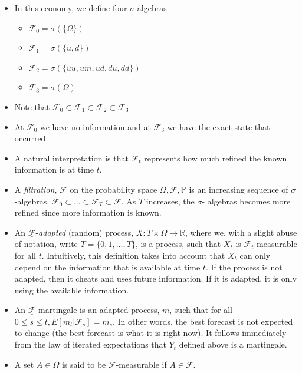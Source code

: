 \documentclass[11pt]{article}
\begin{document}
\begin{itemize}
    \item In this economy, we define four $\sigma$-algebras
    \begin{itemize}
        \item $\mathcal{F}_0 = \sigma(\{\Omega\})$
        \item $\mathcal{F}_1 = \sigma(\{u,d\})$
        \item $\mathcal{F}_2 = \sigma(\{uu, um, ud, du, dd\})$
        \item $\mathcal{F}_3 = \sigma(\Omega)$
    \end{itemize}
    \item Note that $\mathcal{F}_0 \subset \mathcal{F}_1 \subset \mathcal{F}_2 \subset 
    \mathcal{F}_3$ 
    \item At $\mathcal{F}_0$ we have no information and at $\mathcal{F}_3$ we have the exact 
    state that occurred. 
    \item A natural interpretation is that $\mathcal{F}_t$ represents how much refined 
    the known information is at time $t$.
    \item A \textit{filtration}, $\underline{\mathcal{F}}$ on the probability space $\Omega, 
    \mathcal{F}, \mathbb{P}$ is an increasing sequence of $\sigma$-algebras, $\mathcal{F}_0 
    \subset \hdots \subset \mathcal{F}_T \subset \mathcal{F}$. As $T$ increases, the $\sigma$-
    algebras becomes more refined since more information is known. 
    \item An $\underline{\mathcal{F}}$-\textit{adapted} (random) process, $X: T \times \Omega 
    \rightarrow \mathbb{R}$, where we, with a slight abuse of notation, write $T=\{0,1,\ldots,
    T\}$, is a process, such that $X_t$ is $\mathcal{F}_t$-measurable for all $t$. 
    Intuitively, this definition takes into account that $X_t$ can only depend on the 
    information that is available at time $t$. If the process is not adapted, then it cheats 
    and uses future information. If it is adapted, it is only using the available information.
    \item An $\underline{\mathcal{F}}$-martingale is an adapted process, $m$, such that for all 
    $0 \le s \le t, E[m_t|\mathcal{F}_s]=m_s$. In other words, the best forecast is not expected 
    to change (the best forecast is what it is right now). It follows immediately from the law 
    of iterated expectations that $Y_t$ defined above is a martingale. 
    \item A set $A \in \Omega$ is said to be $\mathcal{F}$-measurable if $A \in \mathcal{F}$.
\end{itemize}
\end{document}
